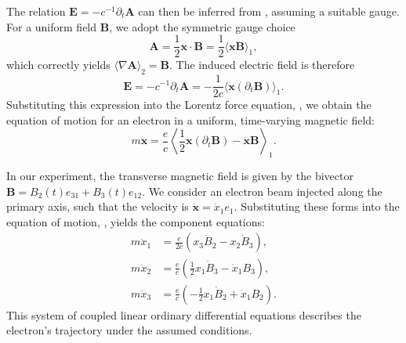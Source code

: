 The relation $\boldsymbol{E} = -c^{-1}\partial_t \boldsymbol{A}$ can then be
inferred from , assuming a suitable gauge. For a
uniform field $\boldsymbol{B}$, we adopt the symmetric gauge choice
\begin{equation}
	\boldsymbol{A} = \frac{1}{2} \boldsymbol{x} \cdot \boldsymbol{B}
	= \frac{1}{2} \langle \boldsymbol{x} \boldsymbol{B} \rangle_{1},
	\label{eq:vector-potential}
\end{equation}
which correctly yields $\langle \nabla \boldsymbol{A} \rangle_{2} =
\boldsymbol{B}$. The induced electric field is therefore
\begin{equation}
	\boldsymbol{E} = -c^{-1}\partial_t \boldsymbol{A}
	= -\frac{1}{2c} \langle \boldsymbol{x} (\partial_t \boldsymbol{B}) \rangle_{1}.
\end{equation}
Substituting this expression into the Lorentz force equation,
, we obtain the equation of motion for an electron in a
uniform, time-varying magnetic field:
\begin{equation}
	m \ddot{\boldsymbol{x}} = \frac{e}{c} \left\langle \frac{1}{2}
		\boldsymbol{x} (\partial_t \boldsymbol{B}) - \dot{\boldsymbol{x}}
	\boldsymbol{B} \right\rangle_{1}.
	\label{eq:eom-uniform-b}
\end{equation}

In our experiment, the transverse magnetic field is given by the bivector
$\boldsymbol{B} = B_2(t) e_{31} + B_3(t) e_{12}$.
We consider an electron beam injected along the primary axis,
such that the velocity is $\dot{\boldsymbol{x}} = \dot{x}_1 e_1$.
Substituting these forms into the equation of motion, ,
yields the component equations:
\begin{align}
	m \ddot{x}_1 &= \frac{e}{2c} \left( x_3 \dot{B}_2 - x_2 \dot{B}_3 \right),
	\label{eq:eom-x1} \\
	m \ddot{x}_2 &= \frac{e}{c} \left( \frac{1}{2} x_1 \dot{B}_3 - \dot{x}_1 B_3
	\right),
	\label{eq:eom-x2} \\
		m \ddot{x}_3 &= \frac{e}{c} \left( -\frac{1}{2} x_1 \dot{B}_2 + \dot{x}_1 B_2
		\right).
	\label{eq:eom-x3}
\end{align}
This system of coupled linear ordinary differential equations describes the
electron's trajectory under the assumed conditions.
